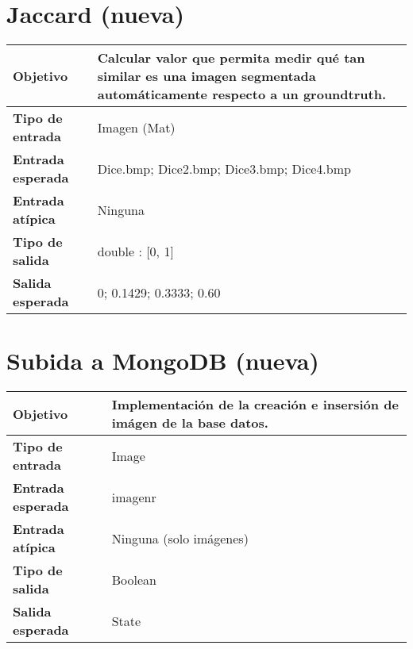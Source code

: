 \documentclass{scrreprt}
\begin{document}
\section{Jaccard (nueva)}
\vspace{0.3cm}
\begin{center}
    \begin{tabular}{|p{4.0cm}|p{9.0cm}|}
        \hline
	    \textbf{Objetivo} & Calcular valor que permita medir qué tan similar es una imagen segmentada automáticamente respecto a un groundtruth. \\
        \hline
	    \textbf{Tipo de entrada} & Imagen (Mat) \\
        \hline
	    \textbf{Entrada esperada} & Dice.bmp; Dice2.bmp; Dice3.bmp; Dice4.bmp \\
        \hline
	    \textbf{Entrada atípica} & Ninguna \\
        \hline
	    \textbf{Tipo de salida} & double : [0, 1] \\
        \hline
	    \textbf{Salida esperada} & 0; 0.1429; 0.3333; 0.60 \\
        \hline        
    \end{tabular}
\end{center}


\section{Subida a MongoDB (nueva)}
\vspace{0.3cm}
\begin{center}
    \begin{tabular}{|p{4.0cm}|p{9.0cm}|}
        \hline
	    \textbf{Objetivo} & Implementación de la creación e insersión de imágen de la base datos.\\
        \hline
	    \textbf{Tipo de entrada} & Image \\
        \hline
	    \textbf{Entrada esperada} & imagenr \\
        \hline
	    \textbf{Entrada atípica} & Ninguna (solo imágenes) \\
        \hline
	    \textbf{Tipo de salida} & Boolean \\
        \hline
	    \textbf{Salida esperada} & State \\
        \hline        
    \end{tabular}
\end{center}
\end{document}
